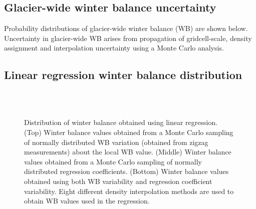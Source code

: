 \documentclass{sfuthesis}
\begin{document}
\begin{appendices}

\chapter{Glacier-wide winter balance uncertainty}

Probability distributions of glacier-wide winter balance (WB) are shown below. Uncertainty in glacier-wide WB arises from propagation of gridcell-scale, density assignment and interpolation uncertainty using a Monte Carlo analysis.

\pagebreak
\section{Linear regression winter balance distribution}

\begin{figure}[b!]
	\centering
	\\%
	\\%
	\caption[]{Distribution of winter balance obtained using linear regression. (Top) Winter balance values obtained from a Monte Carlo sampling of normally distributed WB variation (obtained from zigzag measurements) about the local WB value. (Middle) Winter balance  values obtained from a Monte Carlo sampling of normally distributed regression coefficients. (Bottom) Winter balance  values obtained using both WB variability and regression coefficient variability. Eight different density interpolation methods are used to obtain WB values used in the regression.}
	\label{fig:WSMB_LR_allDensity}
\end{figure}



\end{appendices}
\end{document}
